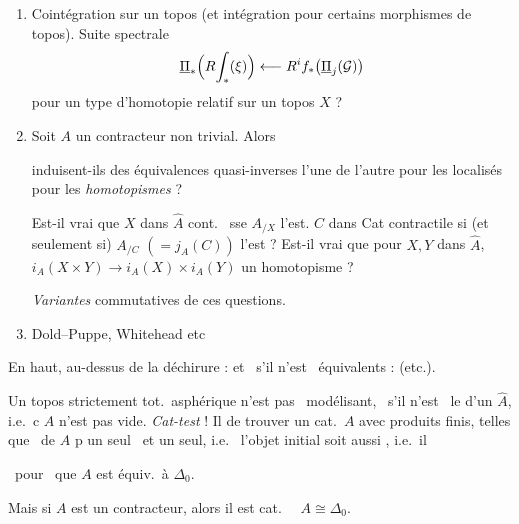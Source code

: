\documentclass[11pt,a4paper]{article}
\begin{document}


\begin{enumerate}
\item[15)] Cointégration sur un topos (et intégration pour certains morphismes
de topos). Suite spectrale
\[
\underline{\Pi}_{*}\Bigl(R\!\int_{*}(\xi)\Bigr) \longleftarrow
R^{i}f_{*}\bigl(\underline{\Pi}_{j}(\mathcal{G})\bigr)
\]
pour un type d'homotopie relatif sur un topos $X$ ?

\item[16.] Soit $A$ un contracteur non trivial. Alors


induisent-ils des équivalences quasi-inverses l'une de l'autre pour les
localisés pour les \emph{homotopismes} ?

Est-il vrai que $X$ dans $\hat{A}$ cont.\  sse $A_{/X}$
l'est.  $C$ dans Cat contractile si (et seulement si)
$A_{/C}$ $(= j_{A}(C))$ l'est ? Est-il vrai que pour $X, Y$ dans $\hat{A}$,
\ill\ $i_{A}(X \times Y) \to i_{A}(X) \times i_{A}(Y)$ un homotopisme ?

\emph{Variantes} commutatives de ces questions.

\item[17)] Dold--Puppe, Whitehead etc
\end{enumerate}



En haut, au-dessus de la déchirure : et \ill\ s'il n'est \ill\ équivalents :
(etc.).

Un topos strictement tot.\ asphérique n'est pas \ill\ modélisant, \ill\ s'il
n'est \ill\ le  d'un $\hat{A}$, i.e.\ c $A$ n'est pas
vide. \emph{Cat-test} ! Il  de trouver un cat.\ $A$
avec \struck{\ill} produits finis, telles que \ill\ de $A$ p un seul
\ill\ et un seul, i.e.\ \struck{\ill} l'objet initial soit aussi \ill, i.e.\
il \ill


\ill\ pour \ill\ que $A$ est équiv.\ à $\Delta_{0}$.

Mais si $A$ est un contracteur, alors il est cat.\ \ill\ 
$A \cong \Delta_{0}$.
\end{document}
